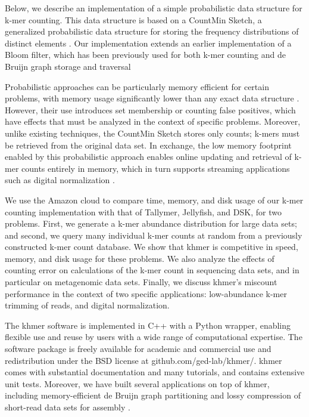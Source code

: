 \documentclass[10pt]{article}
\begin{document}

Below, we describe an implementation of a simple probabilistic data
structure for k-mer counting.  This data structure is based on a
CountMin Sketch, a generalized probabilistic data structure for
storing the frequency distributions of distinct elements
\cite{Cormode2005}.  Our implementation extends an earlier
implementation of a Bloom filter, which has been previously used for
both k-mer counting and de Bruijn graph storage and traversal
\cite{Bloom70,BroderM03,Melsted2011,Pell2012,Rizk2013,Jones2012}

Probabilistic approaches can be particularly memory efficient for
certain problems, with memory usage significantly lower than any exact
data structure \cite{Pell2012}.  However, their use introduces set
membership or counting false positives, which have effects that must
be analyzed in the context of specific problems.  Moreover, unlike
existing techniques, the CountMin Sketch stores only counts;
k-mers must be retrieved from the original data set.  In exchange,
the low memory footprint enabled by this probabilistic approach enables
online updating and retrieval of k-mer counts entirely in memory, which
in turn supports streaming applications such as digital normalization
\cite{Brown2012}.

We use the Amazon cloud to compare time, memory, and disk usage of our k-mer counting
implementation with that of Tallymer, Jellyfish, and DSK, for two problems. First, we 
generate a k-mer abundance distribution for large
data sets; and second, we query many individual k-mer counts at random from
a previously constructed k-mer count database.  We show that khmer
is competitive in speed, memory, and disk usage for these
problems.  We also analyze the effects of counting error on
calculations of the k-mer count in sequencing data sets,
and in particular on metagenomic data sets.  Finally, we discuss
khmer's miscount performance in the context of two specific applications:
low-abundance k-mer trimming of reads, and digital normalization.


The khmer software is implemented in C++ with a Python wrapper,
enabling flexible use and reuse by users with a wide range of
computational
expertise.  The software package is freely available for academic and
commercial use and redistribution under the BSD license at
github.com/ged-lab/khmer/.  khmer comes with substantial documentation
and many tutorials, and contains extensive unit tests.  Moreover, we
have built several applications on top of khmer, including
memory-efficient de Bruijn graph partitioning \cite{Pell2012} and
lossy compression of short-read data sets for assembly
\cite{Brown2012}.
\end{document}
